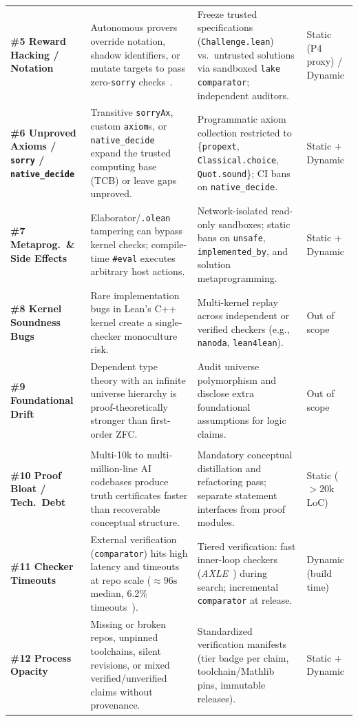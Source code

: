 \documentclass[11pt,letterpaper]{article}
\begin{document}
\begin{table}[!tbp]
\begin{tabularx}{\textwidth}{@{}>{\raggedright\arraybackslash}p{2.35cm}>{\raggedright\arraybackslash}X>{\raggedright\arraybackslash}X>{\raggedright\arraybackslash}p{1.50cm}@{}}
\textbf{\#5 Reward Hacking / Notation} & Autonomous provers override notation, shadow identifiers, or mutate targets to pass zero-\texttt{sorry} checks~\cite{paglieri2026swarms}. & Freeze trusted specifications (\texttt{Challenge.lean}) vs.\ untrusted solutions via sandboxed \texttt{lake comparator}; independent auditors. & Static (P4 proxy) / Dynamic \\
\textbf{\#6 Unproved Axioms / \texttt{sorry} / \texttt{native\_decide}} & Transitive \texttt{sorryAx}, custom \texttt{axiom}s, or \texttt{native\_decide} expand the trusted computing base (TCB) or leave gaps unproved. & Programmatic axiom collection restricted to \{\texttt{propext}, \texttt{Classical.choice}, \texttt{Quot.sound}\}; CI bans on \texttt{native\_decide}. & Static + Dynamic \\
\textbf{\#7 Metaprog.\ \& Side Effects} & Elaborator/\texttt{.olean} tampering can bypass kernel checks; compile-time \texttt{\#eval} executes arbitrary host actions. & Network-isolated read-only sandboxes; static bans on \texttt{unsafe}, \texttt{implemented\_by}, and solution metaprogramming. & Static + Dynamic \\
\textbf{\#8 Kernel Soundness Bugs} & Rare implementation bugs in Lean's C++ kernel create a single-checker monoculture risk. & Multi-kernel replay across independent or verified checkers (e.g., \texttt{nanoda}, \texttt{lean4lean}). & Out of scope \\
\textbf{\#9 Foundational Drift} & Dependent type theory with an infinite universe hierarchy is proof-theoretically stronger than first-order ZFC. & Audit universe polymorphism and disclose extra foundational assumptions for logic claims. & Out of scope \\
\midrule
\multicolumn{4}{@{}l}{\textit{\textbf{Layer C: Structural, Cognitive, and Operational Utility (``Is It Usable, Auditable Science?'')}}} \\
\textbf{\#10 Proof Bloat / Tech.\ Debt} & Multi-10k to multi-million-line AI codebases produce truth certificates faster than recoverable conceptual structure. & Mandatory conceptual distillation and refactoring pass; separate statement interfaces from proof modules. & Static ($>20\text{k}$ LoC) \\
\textbf{\#11 Checker Timeouts} & External verification (\texttt{comparator}) hits high latency and timeouts at repo scale ($\approx 96\text{s}$ median, 6.2\% timeouts~\cite{axle2026}). & Tiered verification: fast inner-loop checkers (\emph{AXLE}~\cite{axle2026}) during search; incremental \texttt{comparator} at release. & Dynamic (build time) \\
\textbf{\#12 Process Opacity} & Missing or broken repos, unpinned toolchains, silent revisions, or mixed verified/unverified claims without provenance. & Standardized verification manifests (tier badge per claim, toolchain/Mathlib pins, immutable releases). & Static + Dynamic \\
\bottomrule
\end{tabularx}
\end{table}
\end{document}
